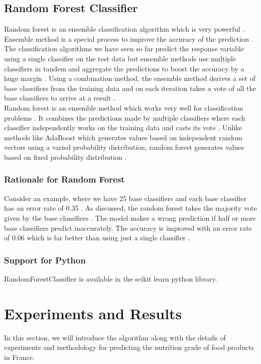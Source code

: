 \documentclass[sigconf]{acmart}
\begin{document}
\subsection{Random Forest Classifier}
Random forest is an ensemble classification algorithm which is very powerful \cite{book-tan}. Ensemble method is a special process to improve the accuracy of the prediction \cite{book-tan}. The classification algorithms we have seen so far predict the response variable using a single classifier on the test data but ensemble methods use multiple classifiers in tandem and aggregate the predictions to boost the accuracy by a huge margin \cite{book-tan}. Using a combination method, the ensemble method derives a set of base classifiers from the training data and on each iteration takes a vote of all the base classifiers to arrive at a result \cite{book-tan}. \\

Random forest is an ensemble method which works very well for classification problems \cite{book-tan}. It combines the predictions made by multiple classifiers where each classifier independently works on the training data and casts its vote \cite{book-tan}. Unlike methods like AdaBoost which generates values based on independent random vectors using a varied probability distribution, random forest generates values based on fixed probability distribution \cite{book-tan}. 

\subsubsection{Rationale for Random Forest}
Consider an example, where we have 25 base classifiers and each base classifier has an error rate of 0.35 \cite{book-tan}. As discussed, the random forest takes the majority vote given by the base classifiers \cite{book-tan}. The model makes a wrong prediction if half or more base classifiers predict inaccurately. The accuracy is improved with an error rate of 0.06 which is far better than using just a single classifier \cite{book-tan}.

\subsubsection{Support for Python} RandomForestClassifier is available in the scikit learn python library.

\section {Experiments and Results}
In this section, we will introduce the algorithm along with the details of experiments and methodology for predicting the nutrition grade of food products in France.
\end{document}
